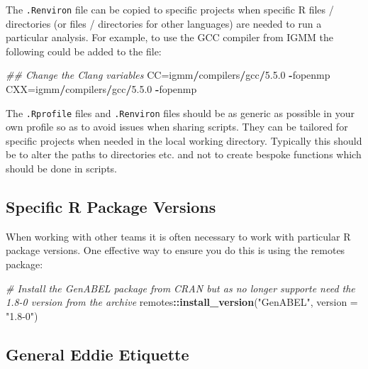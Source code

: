 \documentclass[
]{book}
\newenvironment{Shaded}{\begin{snugshade}}{\end{snugshade}}
\newcommand{\CommentTok}[1]{\textcolor[rgb]{0.56,0.35,0.01}{\textit{#1}}}
\newcommand{\DataTypeTok}[1]{\textcolor[rgb]{0.13,0.29,0.53}{#1}}
\newcommand{\DecValTok}[1]{\textcolor[rgb]{0.00,0.00,0.81}{#1}}
\newcommand{\FloatTok}[1]{\textcolor[rgb]{0.00,0.00,0.81}{#1}}
\newcommand{\KeywordTok}[1]{\textcolor[rgb]{0.13,0.29,0.53}{\textbf{#1}}}
\newcommand{\NormalTok}[1]{#1}
\newcommand{\OperatorTok}[1]{\textcolor[rgb]{0.81,0.36,0.00}{\textbf{#1}}}
\newcommand{\StringTok}[1]{\textcolor[rgb]{0.31,0.60,0.02}{#1}}
\begin{document}
The \texttt{.Renviron} file can be copied to specific projects when specific R files / directories (or files / directories for other languages) are needed to run a particular analysis. For example, to use the GCC compiler from IGMM the following could be added to the file:

\begin{Shaded}
\begin{Highlighting}[]
\CommentTok{## Change the Clang variables}
\NormalTok{CC=igmm}\OperatorTok{/}\NormalTok{compilers}\OperatorTok{/}\NormalTok{gcc}\OperatorTok{/}\DecValTok{5}\NormalTok{.}\FloatTok{5.0} \OperatorTok{-}\NormalTok{fopenmp}
\NormalTok{CXX=igmm}\OperatorTok{/}\NormalTok{compilers}\OperatorTok{/}\NormalTok{gcc}\OperatorTok{/}\DecValTok{5}\NormalTok{.}\FloatTok{5.0} \OperatorTok{-}\NormalTok{fopenmp}
\end{Highlighting}
\end{Shaded}

The \texttt{.Rprofile} files and \texttt{.Renviron} files should be as generic as possible in your own profile so as to avoid issues when sharing scripts. They can be tailored for specific projects when needed in the local working directory. Typically this should be to alter the paths to directories etc. and not to create bespoke functions which should be done in scripts.

\hypertarget{specific-r-package-versions}{%
\subsection{Specific R Package Versions}\label{specific-r-package-versions}}

When working with other teams it is often necessary to work with particular R package versions. One effective way to ensure you do this is using the remotes package:

\begin{Shaded}
\begin{Highlighting}[]
\CommentTok{# Install the GenABEL package from CRAN but as no longer supporte need the 1.8-0 version from the archive}
\NormalTok{remotes}\OperatorTok{::}\KeywordTok{install_version}\NormalTok{(}\StringTok{"GenABEL"}\NormalTok{, }\DataTypeTok{version =} \StringTok{"1.8-0"}\NormalTok{)}
\end{Highlighting}
\end{Shaded}

\hypertarget{general-eddie-etiquette}{%
\subsection{General Eddie Etiquette}\label{general-eddie-etiquette}}
\end{document}
